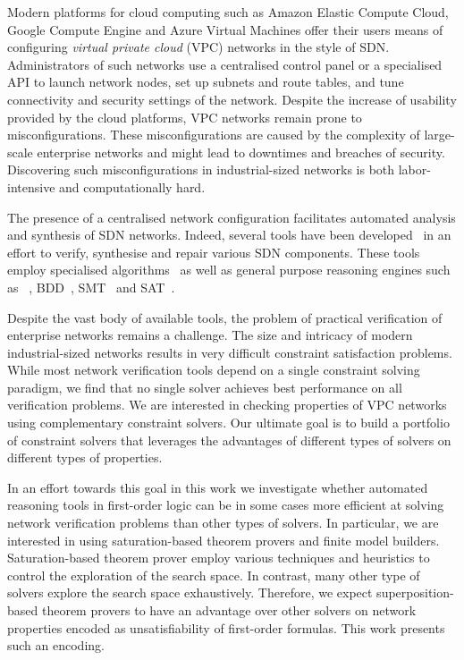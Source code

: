 Modern platforms for cloud computing such as Amazon Elastic Compute Cloud, Google Compute Engine and Azure Virtual Machines offer their users means of configuring \emph{virtual private cloud} (VPC) networks in the style of SDN. Administrators of such networks use a centralised control panel or a specialised API to launch network nodes, set up subnets and route tables, and tune connectivity and security settings of the network. Despite the increase of usability provided by the cloud platforms, VPC networks remain prone to misconfigurations. These misconfigurations are caused by the complexity of large-scale enterprise networks and might lead to downtimes and breaches of security. Discovering such misconfigurations in industrial-sized networks is both labor-intensive and computationally hard. %

The presence of a centralised network configuration facilitates automated analysis and synthesis of SDN networks. Indeed, several tools have been developed~\cite{batfish,jayaraman2014automated,DBLP:conf/icdcit/BjornerJ15,DBLP:conf/pldi/BallBGIKSSV14,Veriflow,ConfigChecker,Anteater,DBLP:conf/cav/El-HassanyTVV17,DBLP:conf/fmcad/HojjatRMCF16} in an effort to verify, synthesise and repair various SDN components. These tools employ specialised algorithms~\cite{Veriflow} as well as general purpose reasoning engines such as \Datalog~\cite{muZ, DBLP:conf/cav/El-HassanyTVV17,batfish}, BDD~\cite{ConfigChecker}, SMT~\cite{jayaraman2014automated,DBLP:conf/icdcit/BjornerJ15} and SAT~\cite{Anteater,DBLP:conf/pldi/BallBGIKSSV14}.

%
%
Despite the vast body of available tools, the problem of practical verification of enterprise networks remains a challenge. The size and intricacy of modern industrial-sized networks results in very difficult constraint satisfaction problems. While most network verification tools depend on a single constraint solving paradigm, we find that no single solver achieves best performance on all verification problems. We are interested in checking properties of VPC networks using complementary constraint solvers. Our ultimate goal is to build a portfolio of constraint solvers that leverages the advantages of different types of solvers on different types of properties.

In an effort towards this goal in this work we investigate whether automated reasoning tools in first-order logic can be in some cases more efficient at solving network verification problems than other types of solvers. In particular, we are interested in using saturation-based theorem provers and finite model builders. Saturation-based theorem prover employ various techniques and heuristics to control the exploration of the search space. In contrast, many other type of solvers explore the search space exhaustively. Therefore, we expect superposition-based theorem provers to have an advantage over other solvers on network properties encoded as unsatisfiability of first-order formulas. This work presents such an encoding.

